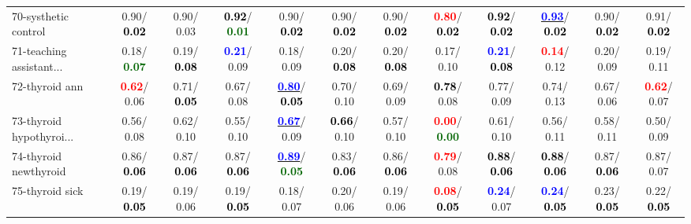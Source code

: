 \begin{table}[h]
\begin{center}
{\begin{tabular}{lc|c|c|c|c|c|c|c|c|c|c}
70-systhetic control &   0.90/\textcolor{black}{\textbf{  0.02}} &   0.90/  0.03 & \textcolor{black}{\textbf{  0.92}}/\textcolor{darkgreen}{\textbf{  0.01}} &   0.90/\textcolor{black}{\textbf{  0.02}} &   0.90/\textcolor{black}{\textbf{  0.02}} &   0.90/\textcolor{black}{\textbf{  0.02}} & \textcolor{red}{\textbf{  0.80}}/\textcolor{black}{\textbf{  0.02}} & \textcolor{black}{\textbf{  0.92}}/\textcolor{black}{\textbf{  0.02}} & \underline{\textcolor{blue}{\textbf{  0.93}}}/\textcolor{black}{\textbf{  0.02}} &   0.90/\textcolor{black}{\textbf{  0.02}} &   0.91/\textcolor{black}{\textbf{  0.02}} \\
71-teaching assistant... &   0.18/\textcolor{darkgreen}{\textbf{  0.07}} &   0.19/\textcolor{black}{\textbf{  0.08}} & \textcolor{blue}{\textbf{  0.21}}/  0.09 &   0.18/  0.09 &   0.20/\textcolor{black}{\textbf{  0.08}} &   0.20/\textcolor{black}{\textbf{  0.08}} &   0.17/  0.10 & \textcolor{blue}{\textbf{  0.21}}/\textcolor{black}{\textbf{  0.08}} & \textcolor{red}{\textbf{  0.14}}/  0.12 &   0.20/  0.09 &   0.19/  0.11 \\ \hline
72-thyroid ann & \textcolor{red}{\textbf{  0.62}}/  0.06 &   0.71/\textcolor{black}{\textbf{  0.05}} &   0.67/  0.08 & \underline{\textcolor{blue}{\textbf{  0.80}}}/\textcolor{black}{\textbf{  0.05}} &   0.70/  0.10 &   0.69/  0.09 & \textcolor{black}{\textbf{  0.78}}/  0.08 &   0.77/  0.09 &   0.74/  0.13 &   0.67/  0.06 & \textcolor{red}{\textbf{  0.62}}/  0.07 \\
73-thyroid hypothyroi... &   0.56/  0.08 &   0.62/  0.10 &   0.55/  0.10 & \underline{\textcolor{blue}{\textbf{  0.67}}}/  0.09 & \textcolor{black}{\textbf{  0.66}}/  0.10 &   0.57/  0.10 & \textcolor{red}{\textbf{  0.00}}/\textcolor{darkgreen}{\textbf{  0.00}} &   0.61/  0.10 &   0.56/  0.11 &   0.58/  0.11 &   0.50/  0.09 \\
74-thyroid newthyroid &   0.86/\textcolor{black}{\textbf{  0.06}} &   0.87/\textcolor{black}{\textbf{  0.06}} &   0.87/\textcolor{black}{\textbf{  0.06}} & \underline{\textcolor{blue}{\textbf{  0.89}}}/\textcolor{darkgreen}{\textbf{  0.05}} &   0.83/\textcolor{black}{\textbf{  0.06}} &   0.86/\textcolor{black}{\textbf{  0.06}} & \textcolor{red}{\textbf{  0.79}}/  0.08 & \textcolor{black}{\textbf{  0.88}}/\textcolor{black}{\textbf{  0.06}} & \textcolor{black}{\textbf{  0.88}}/\textcolor{black}{\textbf{  0.06}} &   0.87/\textcolor{black}{\textbf{  0.06}} &   0.87/  0.07 \\
75-thyroid sick &   0.19/\textcolor{black}{\textbf{  0.05}} &   0.19/  0.06 &   0.19/\textcolor{black}{\textbf{  0.05}} &   0.18/  0.07 &   0.20/  0.06 &   0.19/  0.06 & \textcolor{red}{\textbf{  0.08}}/\textcolor{black}{\textbf{  0.05}} & \textcolor{blue}{\textbf{  0.24}}/  0.07 & \textcolor{blue}{\textbf{  0.24}}/\textcolor{black}{\textbf{  0.05}} &   0.23/\textcolor{black}{\textbf{  0.05}} &   0.22/\textcolor{black}{\textbf{  0.05}} \\

\end{tabular}}
\end{center}
\end{table}
